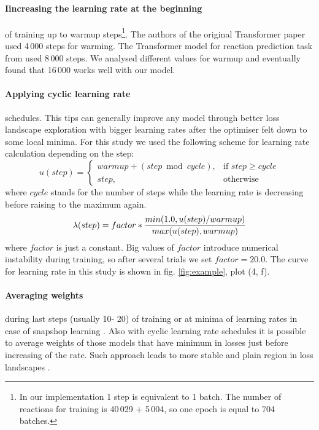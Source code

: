\documentclass{article}
\begin{document}
\paragraph{Iincreasing the learning rate at the beginning} of training up to warmup steps\footnote{In our implementation 1 step is equivalent to 1 batch. The number of reactions for training is 40\,029 + 5\,004, so one epoch is equal to 704 batches.}. The authors of the original Transformer paper \cite{Transformer}  used 4\,000 steps for warming. The Transformer model for reaction prediction task from \cite{SchwallerTransformer} used 8\,000 steps. We analysed different values for warmup and eventually found that 16\,000 works well with our model.
\paragraph{Applying cyclic learning rate} schedules. This tips can generally improve any model \cite{Izmailov} through better loss landscape exploration with bigger learning rates after the optimiser felt down to some local minima. For this study we used the following scheme for learning rate calculation depending on the step:
\[
    u(step)= 
\begin{cases}
    warmup + (step \bmod cycle), & \text{if } step \ge cycle\\
    step,              & \text{otherwise}
\end{cases}
\]
where $cycle$ stands for the number of steps while the learning rate is decreasing before raising to the maximum again.
\begin{equation}
\label{eq:rate}
\lambda(step) = factor * { {min (1.0, u(step) / warmup ) } \over { max (u(step), warmup) } }
\end{equation}	
where $factor$ is just a constant. Big values of $factor$ introduce numerical instability during training, so after several trials we set $factor = 20.0$. The curve for learning rate in this study is shown in fig. \ref{fig:example}, plot (4, f). 
\paragraph{Averaging weights} during last steps (usually 10- 20) of training or at minima of learning rates in case of snapshop learning \cite{Snapshot}. Also with cyclic learning rate schedules it is possible to average weights of those models that have minimum in losses just before increasing of the rate. Such approach leads to more stable and plain region in loss landscapes \cite{Izmailov}. 
\end{document}
